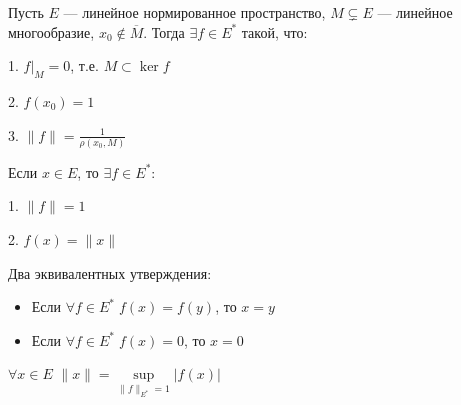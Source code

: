\begin{corollary}[1] Пусть $E$ --- линейное нормированное пространство, $M \subsetneq E$ --- линейное многообразие, $x_0 \notin \overline{M} $. Тогда $\exists f \in E^*$ такой, что:

1. $f |_M = 0$, т.е. $M \subset \ker f$

2. $f(x_0) = 1$

3. $\|f\| = \frac{1}{\rho(x_0, M)}$
\end{corollary}

\begin{corollary}[2] \label{hbcorollary2} Если $x \in E$, то $\exists f \in E^*$:

1. $\|f\| = 1$

2. $f(x) = \|x\|$
\end{corollary}
\begin{corollary}[3] Два эквивалентных утверждения:
\label{hbcorollary3}
\begin{itemize}
    \item Если $\forall f \in E^* \; f(x) = f(y)$, то $x = y$
    \item Если $\forall f \in E^* \; f(x) = 0$, то $x = 0$
\end{itemize}
\end{corollary}

\begin{corollary}[4]
\label{hbcorollary4}
$\forall x \in E $ $\|x\| = \sup\limits_{\| f\| _{E^*} = 1} |f(x)|$
\end{corollary}
